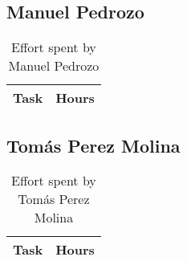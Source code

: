 \subsection{Manuel Pedrozo}

\begin{table}[H]
    \centering
    \begin{tabular}{|p{7cm}|c|}
    \hline
    \textbf{Task} & \textbf{Hours} \\ \hline
    \end{tabular}
    \caption{\label{tbl:manuel-effort} Effort spent by Manuel Pedrozo}
    \end{table}

\subsection{Tomás Perez Molina}
\begin{table}[H]
    \centering
    \begin{tabular}{|p{7cm}|c|}
    \hline
    \textbf{Task} & \textbf{Hours} \\ \hline
    \end{tabular}
    \caption{\label{tbl:tomas-effort} Effort spent by Tomás Perez Molina}
    \end{table}
